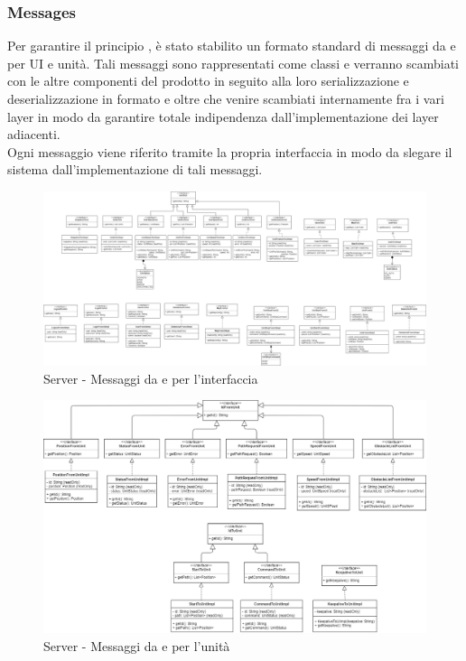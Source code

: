 \subsubsection{Messages}
Per garantire il principio , è stato stabilito un formato standard di messaggi da e per UI e unità. Tali messaggi sono rappresentati come classi  e verranno scambiati con le altre componenti del prodotto in seguito alla loro serializzazione e deserializzazione in formato  e oltre che venire scambiati internamente fra i vari layer in modo da garantire totale indipendenza dall'implementazione dei layer adiacenti.\\
Ogni messaggio viene riferito tramite la propria interfaccia in modo da slegare il sistema dall'implementazione di tali messaggi.

\begin{landscape}
    \begin{figure}[H]
        \centering
        \includegraphics[width=24cm]{img/server_from_to_ui.png}
        \caption{Server - Messaggi da e per l'interfaccia}
    \end{figure}
\end{landscape}

\begin{landscape}
    \begin{figure}[H]
        \centering
        \includegraphics[width=24cm]{img/server_from_to_unit.png}
        \caption{Server - Messaggi da e per l'unità}
    \end{figure}
\end{landscape}

